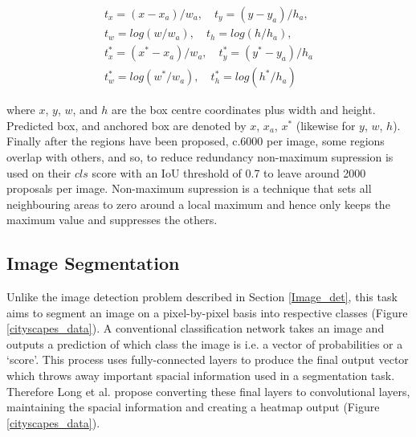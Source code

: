 \documentclass[a4paper,11pt,notitlepage]{article}
\begin{document}
\begin{equation}
\begin{aligned}
\label{bounding_box_loss}
t_{x} = (x-x_{a})/w_{a}, \quad t_{y} = (y-y_{a})/h_{a},\\
t_{w} = log(w/w_{a}), \quad t_{h} = log(h/h_{a}), \\
t_{x}^{*} = (x^{*}-x_{a})/w_{a},\quad t_{y}^{*} = (y^{*} - y_{a})/h_{a} \\
t_{w}^{*} = log(w^{*}/w_{a}), \quad t_{h}^{*} = log(h^{*}/h_{a})
\end{aligned}
\end{equation}

where $x$, $y$, $w$, and $h$ are the box centre coordinates plus width and height. Predicted box, and anchored box are denoted by $x$, $x_{a}$, $x^{*}$ (likewise for $y$, $w$, $h$).
\newline \newline
Finally after the regions have been proposed, c.6000 per image, some regions overlap with others, and so, to reduce redundancy non-maximum supression is used on their $cls$ score with an IoU threshold of 0.7 to leave around 2000 proposals per image. Non-maximum supression is a technique that sets all neighbouring areas to zero around a local maximum and hence only keeps the maximum value and suppresses the others.
 
\subsection{Image Segmentation}\label{image_seg}
Unlike the image detection problem described in Section \ref{Image_det}, this task aims to segment an image on a pixel-by-pixel basis into respective classes (Figure \ref{cityscapes_data}). A conventional classification network takes an image and outputs a prediction of which class the image is i.e. a vector of probabilities or a `score'. This process uses fully-connected layers to produce the final output vector which throws away important spacial information used in a segmentation task. Therefore Long et al. \cite{DBLP:journals/corr/LongSD14} propose converting these final layers to convolutional layers, maintaining the spacial information and creating a heatmap output (Figure \ref{cityscapes_data}).
\end{document}
